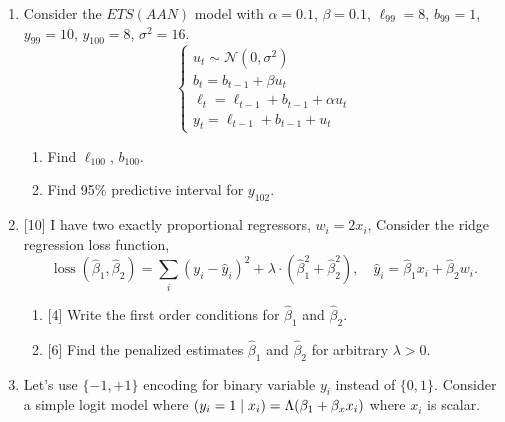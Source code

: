 \documentclass[12pt]{article}
\DeclareMathOperator{\loss}{loss}
\let\P\relax
\DeclareMathOperator{\P}{\mathbb{P}}
\newcommand \cN{\mathcal{N}}
\newcommand{\hb}{\hat{\beta}}
\begin{document}

\begin{enumerate}
    \item Consider the $ETS(AAN)$ model with $\alpha = 0.1$, $\beta=0.1$, $\ell_{99}=8$, $b_{99}=1$, $y_{99}=10$, $y_{100}=8$, $\sigma^2=16$.
    \[
      \begin{cases}
            u_t \sim \cN (0, \sigma^2) \\
            b_t = b_{t-1} + \beta u_t \\
            \ell_t = \ell_{t-1} + b_{t-1} + \alpha u_t \\
            y_t = \ell_{t-1} + b_{t-1} + u_t
      \end{cases}
    \]    
     \begin{enumerate}
      \item Find $\ell_{100}$, $b_{100}$.
      \item Find 95\% predictive interval for $y_{102}$.
    \end{enumerate}

    \item {[10]} I have two exactly proportional regressors, $w_i = 2x_i$, 
    Consider the ridge regression loss function,  
    \[
    \loss(\hb_1, \hb_2) = \sum_i (y_i - \hat y_i)^2 + \lambda \cdot (\hb_1^2 + \hb_2^2), \quad \hat y_i = \hb_1 x_i + \hb_2 w_i.
    \] 
    \begin{enumerate}
        \item {[4]} Write the first order conditions for $\hb_1$ and $\hb_2$.
        \item {[6]} Find the penalized estimates $\hb_1$ and $\hb_2$ for arbitrary $\lambda > 0$.
    \end{enumerate}


    \item Let's use $\{-1, +1\}$ encoding for binary variable $y_i$ instead of $\{0, 1\}$.
    Consider a simple logit model where $\P(y_i = 1 \mid x_i) = \Lambda(\beta_1 + \beta_x x_i)$ where $x_i$ is scalar. 
    

\end{enumerate}
\end{document}

